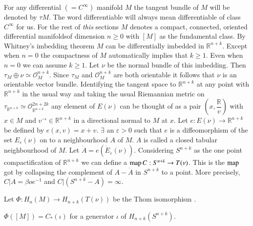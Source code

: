For any differential $(=C^\infty)$ manifold  $M$ the tangent bundle of
$M$ will be denoted by $\tau M$. The word differentiable will always
mean differentiable of class $C^\infty$ for us. For the rest of
\textit{this} sections $M$ denotes a compact, connected, oriented
differential manifolds\pageoriginale of dimension $n \geq 0$ with
$[M]$ as the fundamental class. By Whitney's imbedding theorem $M$ can be
differentially imbedded in $\mathbb{R}^{n+k}$. Except when $n=0$ the
compactness of $M$ automatically implies that $k \geq 1$. Even when
$n=0$ we can assume $k \geq 1$. Let $\nu$ be the normal bundle of this
imbedding. Then $\tau_M \oplus \nu \simeq
\mathscr{O}^{n+k}_{M}$. Since $\tau_M$ and $\mathscr{O}^{n+k}_{M}$ are
both orientable it follows that $\nu$ is an orientable vector
bundle. Identifying the tangent space  to $\mathbb{R}^{n+k}$ at any
point with $\mathbb{R}^{n+k}$ in the usual way and taking the usual
Riemannian metric on $\tau_{\mathbb{R}^{n+k}} \simeq \mathscr{O}^{2n
  + 2k}_{\mathbb{R}^{n+k}}$ any element of $E(\nu)$ can be thought of as a pair
$(x, \dfrac{\mathbb{R}}{v})$ with $x \in M$ and $v^{\to} \in  
\mathbb{R}^{n+k}$ in a directional normal to $M$ at $x$. Let $e :
E(\nu) \to \mathbb{R}^{n+k}$ be defined by $e (x, v) = x+v$. $\exists$
an $\varepsilon > 0$ such that $e$ is a diffeomorphism of the set
$E_\varepsilon (\nu)$ on to a neighbourhood $A$ of $M$. $A$ is called a
closed tabular neighbourhood of $M$. Let $\dot{A} = e
(\dot{E}_\varepsilon (\nu))$. Considering $S^{n+k}$ as the one point
compactification of $\mathbb{R}^{n+k}$ we can define a $\operatorname{map} C: S^{n+k}
\to T(\nu)$. This is the $\operatorname{map}$ got by collapsing the complement of $A
-\dot{A}$ in $S^{n+k}$ to a point. More precisely, $C| A = \beta
oe^{-1}$ and $C | (S^{n+k} - A) = \infty$.  

Let $\Phi : H_n (M) \to H_{n+k} (T (\nu))$ be the Thom isomorphism
\cite{c1:key5}.  


\setcounter{prop}{4}
\begin{prop}\label{chap1:prop1.5}%
$\Phi ([M]) = C_* (\iota)$ for a generator $\iota$ of $H_{n+k} (S^{n+k})$.  
 \end{prop} 
 
